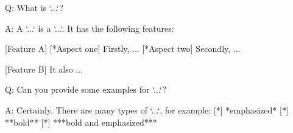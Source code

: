 Q:
  What is `...`?

A:
  A `...` is a `...`. It has the following features:

  [Feature A]
    [*Aspect one] Firstly, ...
    [*Aspect two] Secondly, ...

  [Feature B]
    It also ...

Q:
  Can you provide some examples for `...`?

A:
  Certainly. There are many types of `...`, for example:
    [*] *emphasized*
    [*] **bold**
    [*] ***bold and emphasized***